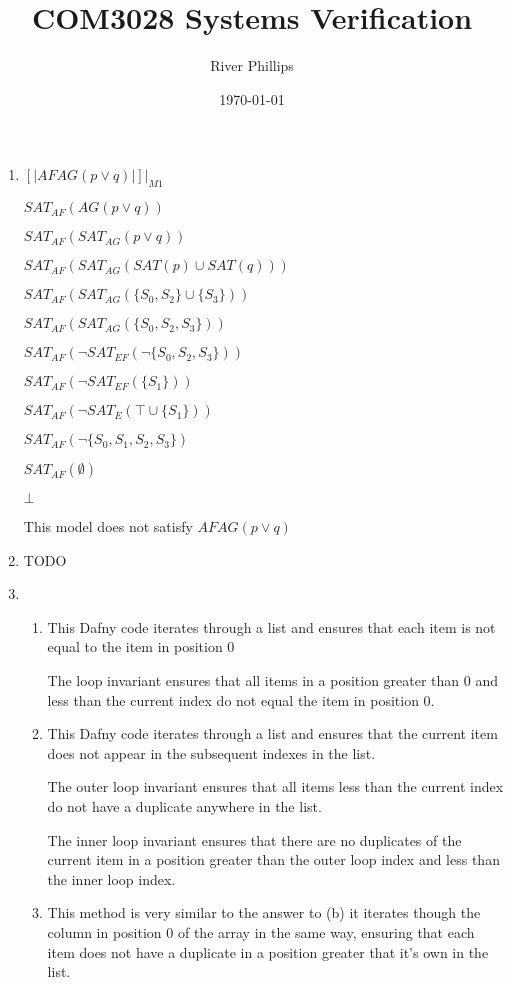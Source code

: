 \documentclass[12pt, a4paper]{article}
\title{COM3028 Systems Verification}
\author{River Phillips}
\date{\today}
\begin{document}
\maketitle

\begin{enumerate}
\item 
$[|AF AG (p \lor q)|]|_{M1}$

$SAT_{AF}(AG(p \lor q))$

$SAT_{AF}(SAT_{AG}(p \lor q))$

$SAT_{AF}(SAT_{AG}(SAT(p) \cup SAT(q)))$

$SAT_{AF}(SAT_{AG}(\{S_0, S_2\} \cup \{S_3\}))$

$SAT_{AF}(SAT_{AG}(\{S_0, S_2, S_3\}))$

$SAT_{AF}(\neg SAT_{EF}(\neg \{S_0, S_2, S_3\}))$

$SAT_{AF}(\neg SAT_{EF}( \{S_1\}))$

$SAT_{AF}(\neg SAT_{E}(\top \cup \{S_1 \} ))$

$SAT_{AF}(\neg \{S_0, S_1, S_2, S_3 \})$

$SAT_{AF}(\emptyset)$

$\bot$


This model does not satisfy $AF AG (p \lor q)$

\item TODO

\item
	\begin{enumerate}
	\item This Dafny code iterates through a list and ensures that each item is not equal to the item in position 0
	
	The loop invariant ensures that all items in a position greater than 0 and less than the current index do not equal the item in position 0.
	
	\item This Dafny code iterates through a list and ensures that the current item does not appear in the subsequent indexes in the list.
	
	The outer loop invariant ensures that all items less than the current index do not have a duplicate anywhere in the list.
	
	The inner loop invariant ensures that there are no duplicates of the current item in a position greater than the outer loop index and less than the inner loop index.
	
		
	\item This method is very similar to the answer to (b) it iterates though the column in position 0 of the array in the same way, ensuring that each item does not have a duplicate in a position greater that it's own in the list.
	

\end{enumerate}
\end{enumerate}
\end{document}
